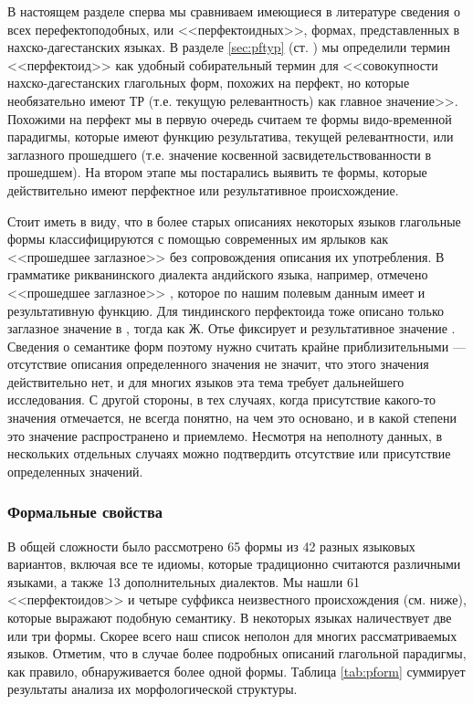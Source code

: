 \par В настоящем разделе сперва мы сравниваем имеющиеся в литературе сведения о всех перефектоподобных, или <<перфектоидных>>, формах, представленных в нахско-дагестанских языках. \color{purple}В разделе \ref{sec:pftyp} (ст. \pageref{perfectoidpage}) мы определили термин <<перфектоид>> как удобный собирательный термин для <<совокупности нахско-дагестанских глагольных форм, похожих на перфект, но которые необязательно имеют ТР (т.е. текущую релевантность) как главное значение>>. Похожими на перфект мы в первую очередь считаем те формы видо-временной парадигмы, которые имеют функцию результатива, текущей релевантности, или заглазного прошедшего (т.е. значение косвенной засвидетельствованности в прошедшем). На втором этапе мы постарались выявить те формы, которые действительно имеют перфектное или результативное происхождение. 
\par Стоит иметь в виду, что в более старых описаниях некоторых языков глагольные формы классифицируются с помощью современных им ярлыков как <<прошедшее заглазное>> без сопровождения описания их употребления. В грамматике рикванинского диалекта андийского языка, например, отмечено <<прошедшее заглазное>> \citep{sulejmanov1957}, которое по нашим полевым данным имеет и результативную функцию. Для тиндинского перфектоида тоже описано только заглазное значение в \citep{magomedova2012}, тогда как Ж. Отье фиксирует и результативное значение \citep{authiertindi}. Сведения о семантике форм поэтому нужно считать крайне приблизительными --- отсутствие описания определенного значения не значит, что этого значения действительно нет, и для многих языков эта тема требует дальнейшего исследования. С другой стороны, в тех случаях, когда присутствие какого-то значения отмечается, не всегда понятно, на чем это основано, и в какой степени это значение распространено и приемлемо. Несмотря на неполноту данных, в нескольких отдельных случаях можно подтвердить отсутствие или присутствие определенных значений.

\subsubsection{Формальные свойства} \label{sec:pfform}

В общей сложности было рассмотрено 65 формы из 42 разных языковых вариантов, включая все те идиомы, которые традиционно считаются различными языками, а также 13 дополнительных диалектов. Мы нашли 61 <<перфектоидов>> и четыре суффикса неизвестного происхождения (см. ниже), которые выражают подобную семантику. В некоторых языках наличествует две или три формы. Скорее всего наш список неполон для многих рассматриваемых языков. Отметим, что в случае более подробных описаний глагольной парадигмы, как правило, обнаруживается более одной формы. Таблица \ref{tab:pform} суммирует результаты анализа их морфологической структуры. 

